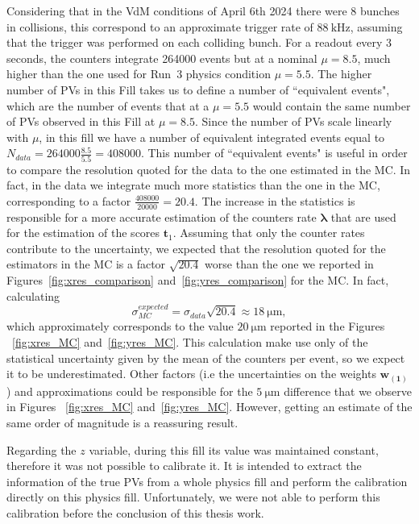 Considering that in the VdM conditions of April 6th 2024 there were 8 bunches in collisions, this correspond to an approximate trigger rate of $\SI{88}{\kilo\hertz}$, assuming that the trigger was performed on each colliding bunch. For a readout every 3 seconds, the counters integrate 264000 events but at a nominal $\mu=8.5$, much higher than the one used for Run~3 physics condition $\mu=5.5$. The higher number of PVs in this Fill takes us to define a number of ``equivalent events", which are the number of events that at a $\mu=5.5$ would contain the same number of PVs observed in this Fill at $\mu=8.5$. Since the number of PVs scale linearly with $\mu$, in this fill we have a number of equivalent integrated events equal to$N_{data}=264000\tfrac{8.5}{5.5}=408000$. This number of ``equivalent events" is useful in order to compare the resolution quoted for the data to the one estimated in the MC. In fact, in the data we integrate much more statistics than the one in the MC, corresponding to a factor $\tfrac{408000}{20000}=20.4$.  The increase in the statistics is responsible for a more accurate estimation of the counters rate $\mathbf{\lambda}$ that are used for the estimation of the scores $\mathbf{t}_{1}$. Assuming that only the counter rates contribute to the uncertainty, we expected that the resolution quoted for the estimators in the MC is a factor $\sqrt{20.4}$ worse than the one we reported in Figures~\ref{fig:xres_comparison} and~\ref{fig:yres_comparison} for the MC. In fact, calculating
\begin{equation}
    \sigma_{MC}^{expected} = \sigma_{data}\sqrt{20.4} \approx \SI{18}{\micro\meter},
\end{equation}
which approximately corresponds to the value $\SI{20}{\micro\meter}$ reported in the Figures ~\ref{fig:xres_MC} and~\ref{fig:yres_MC}. This calculation make use only of the statistical uncertainty given by the mean of the counters per event, so we expect it to be underestimated. Other factors (i.e the uncertainties on the weights $\mathbf{w_{(1)}}$) and approximations could be responsible for the $\SI{5}{\micro\meter}$ difference that we observe in Figures ~\ref{fig:xres_MC} and~\ref{fig:yres_MC}. However, getting an estimate of the same order of magnitude is a reassuring result.

Regarding the $z$ variable, during this fill its value was maintained constant, therefore it was not possible to calibrate it. It is intended to extract the information of the true PVs from a whole physics fill and perform the calibration directly on this physics fill. Unfortunately, we were not able to perform this calibration before the conclusion of this thesis work. 


